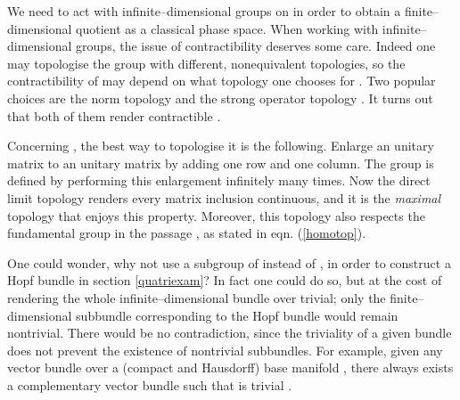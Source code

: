 \documentclass[a4paper,a4paper]{article}
\begin{document}
We need to act with infinite--dimensional groups \coordHE{} on \coordHE{} in order to 
obtain a finite--dimensional quotient \coordHE{} as a classical phase space.
When working with infinite--dimensional groups, the issue of contractibility 
deserves some care. Indeed one may topologise the group \coordHE{} with 
different, nonequivalent topologies, so the contractibility of \coordHE{} 
may depend on what topology one chooses for \coordHE{}. Two popular 
choices are the norm topology and the strong operator topology \cite{DIXMIER}. 
It turns out that both of them render \coordHE{} contractible 
\cite{KUIPER, DIXMIER}. 

Concerning \coordHE{}, the best way to topologise it is the following.
Enlarge  an \coordHE{} unitary matrix to an \coordHE{} unitary 
matrix by adding one row and one column. The group \coordHE{} is defined 
by performing this enlargement infinitely many times. Now the direct limit 
topology \cite{BOURBAKI} renders every matrix inclusion \coordHE{} 
continuous, and it is the {\it maximal} topology that enjoys this property. 
Moreover, this topology also respects the fundamental group \coordHE{} 
in the passage \coordHE{}, as stated in eqn. (\ref{homotop}).

One could wonder, why not use a \coordHE{} subgroup of \coordHE{} instead 
of \coordHE{}, in order to construct a Hopf bundle in section \ref{quatriexam}? 
In fact one could do so, but at the cost of rendering the whole 
infinite--dimensional bundle over \coordHE{} trivial; only the finite--dimensional 
subbundle corresponding to the Hopf bundle would remain nontrivial. There would be no 
contradiction, since the triviality of a given bundle does not prevent 
the existence of nontrivial subbundles. For example, given any vector bundle 
\coordHE{} over a (compact and Hausdorff) base manifold \coordHE{}, 
there always exists a complementary vector bundle \coordHE{} 
such that \coordHE{} is trivial \cite{ATIYAH}. 
\end{document}
